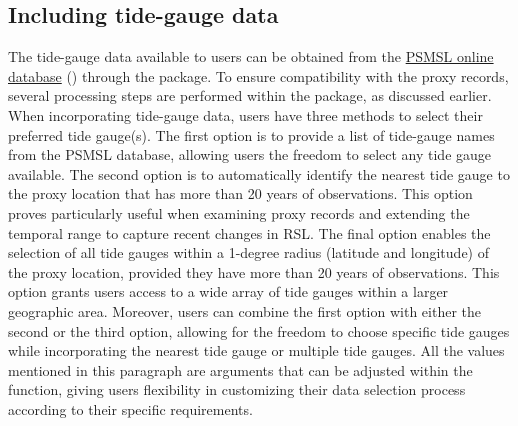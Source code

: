 \subsection{Including tide-gauge data}\label{additionaldata}
The tide-gauge data available to users can be obtained from the \href{https://psmsl.org/data/obtaining/complete.php}{PSMSL online database} (\citep{Holgate_PSMSL2013, Woodworth2003}) through the  package. To ensure compatibility with the proxy records, several processing steps are performed within the package, as discussed earlier.
When incorporating tide-gauge data, users have three methods to select their preferred tide gauge(s). The first option is to provide a list of tide-gauge names from the PSMSL database, allowing users the freedom to select any tide gauge available. The second option is to automatically identify the nearest tide gauge to the proxy location that has more than 20 years of observations. This option proves particularly useful when examining proxy records and extending the temporal range to capture recent changes in RSL.
The final option enables the selection of all tide gauges within a 1-degree radius (latitude and longitude) of the proxy location, provided they have more than 20 years of observations. This option grants users access to a wide array of tide gauges within a larger geographic area. Moreover, users can combine the first option with either the second or the third option, allowing for the freedom to choose specific tide gauges while incorporating the nearest tide gauge or multiple tide gauges.
All the values mentioned in this paragraph are arguments that can be adjusted within the function, giving users flexibility in customizing their data selection process according to their specific requirements.
